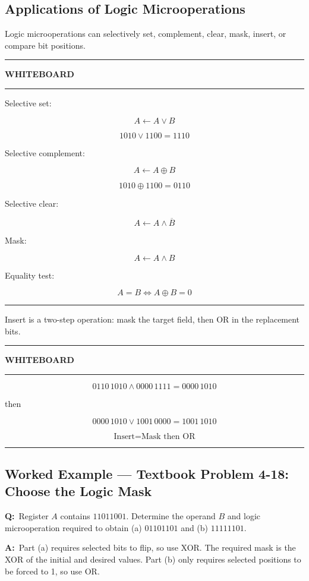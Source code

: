 \documentclass[11pt]{article}
\newenvironment{whiteboard}
{
    \par\medskip
    \hrule
    \vspace{0.35em}
    \noindent\textbf{\large WHITEBOARD}
    \par\vspace{0.3em}
    \hrule
    \vspace{0.65em}
}
{
    \vspace{0.45em}
    \hrule
    \par\medskip
}
\newcommand{\Q}{\par\noindent\textbf{Q:}\ }
\newcommand{\A}{\par\noindent\textbf{A:}\ }
\newcommand{\worked}[1]{%
    \subsection*{Worked Example --- #1}
}
\begin{document}
\subsection{Applications of Logic Microoperations}

Logic microoperations can selectively set, complement, clear, mask, insert, or compare bit positions.

\begin{whiteboard}

Selective set:

\[
\boxed{A\leftarrow A\vee B}
\]

\[
1010\vee1100=1110
\]

Selective complement:

\[
\boxed{A\leftarrow A\oplus B}
\]

\[
1010\oplus1100=0110
\]

Selective clear:

\[
\boxed{A\leftarrow A\wedge\overline B}
\]

Mask:

\[
\boxed{A\leftarrow A\wedge B}
\]

Equality test:

\[
\boxed{A=B\iff A\oplus B=0}
\]

\end{whiteboard}

Insert is a two-step operation: mask the target field, then OR in the replacement bits.

\begin{whiteboard}

\[
0110\,1010
\wedge
0000\,1111
=
0000\,1010
\]

then

\[
0000\,1010
\vee
1001\,0000
=
\boxed{1001\,1010}
\]

\[
\boxed{\text{Insert}=\text{Mask then OR}}
\]

\end{whiteboard}

\worked{Textbook Problem 4-18: Choose the Logic Mask}

\Q Register $A$ contains $11011001$. Determine the operand $B$ and logic microoperation required to obtain (a) $01101101$ and (b) $11111101$.

\A Part (a) requires selected bits to flip, so use XOR. The required mask is the XOR of the initial and desired values. Part (b) only requires selected positions to be forced to 1, so use OR.
\end{document}
